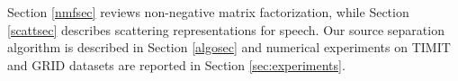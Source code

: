 Section \ref{nmfsec} reviews non-negative matrix factorization, while Section \ref{scattsec} describes scattering 
representations for speech. Our source separation algorithm is described in Section \ref{algosec} and 
numerical experiments on TIMIT and GRID datasets are reported in Section \ref{sec:experiments}.




